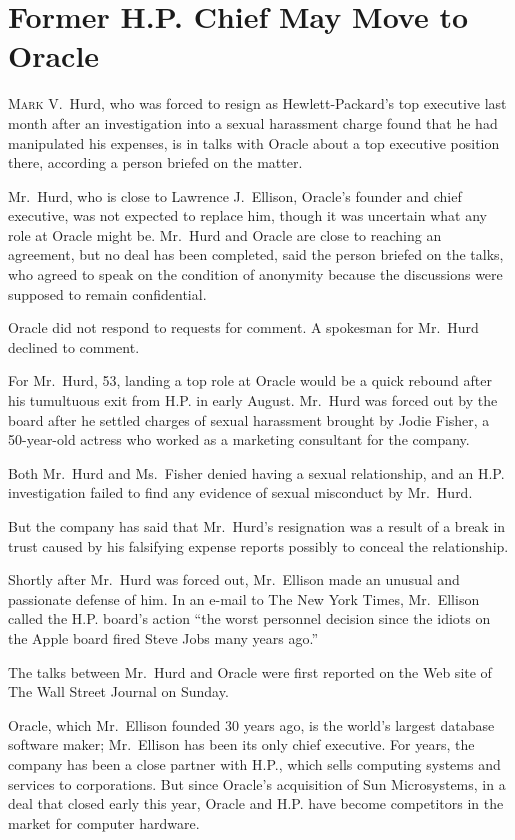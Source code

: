 ﻿\documentclass[12pt]{article}
\begin{document}
\pagebreak
\section{Former H.P. Chief May Move to Oracle}

\lettrine{M}{ark} V.~Hurd, who was forced to resign as Hewlett-Packard's
top executive last month after an investigation into a sexual harassment charge found that he had
manipulated his expenses, is in talks with Oracle about a top executive position there, according a
person briefed on the matter.

Mr.~Hurd, who is close to Lawrence J.~Ellison, Oracle's founder and chief executive, was not
expected to replace him, though it was uncertain what any role at Oracle might be. Mr.~Hurd and
Oracle are close to reaching an agreement, but no deal has been completed, said the person briefed
on the talks, who agreed to speak on the condition of anonymity because the discussions were
supposed to remain confidential.

Oracle did not respond to requests for comment. A spokesman for Mr.~Hurd declined to comment.

For Mr.~Hurd, 53, landing a top role at Oracle would be a quick rebound after his tumultuous exit
from H.P. in early August. Mr.~Hurd was forced out by the board after he settled charges of sexual
harassment brought by Jodie Fisher, a 50-year-old actress who worked as a marketing consultant for
the company.

Both Mr.~Hurd and Ms.~Fisher denied having a sexual relationship, and an H.P. investigation failed
to find any evidence of sexual misconduct by Mr.~Hurd.

But the company has said that Mr.~Hurd's resignation was a result of a break in trust caused by his
falsifying expense reports possibly to conceal the relationship.

Shortly after Mr.~Hurd was forced out, Mr.~Ellison made an unusual and passionate defense of him. In
an e-mail to The New York Times, Mr.~Ellison called the H.P. board's action ``the worst personnel
decision since the idiots on the Apple board fired Steve Jobs many years ago.''

The talks between Mr.~Hurd and Oracle were first reported on the Web site of The Wall Street Journal
on Sunday.

Oracle, which Mr.~Ellison founded 30 years ago, is the world's largest database software maker;
Mr.~Ellison has been its only chief executive. For years, the company has been a close partner with
H.P., which sells computing systems and services to corporations. But since Oracle's acquisition of
Sun Microsystems, in a deal that closed early this year, Oracle and H.P. have become competitors in
the market for computer hardware.
\end{document}
